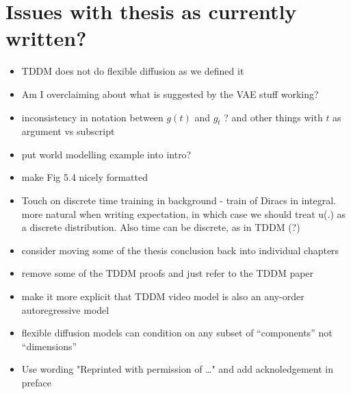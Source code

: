 \section*{Issues with thesis as currently written?}

\begin{itemize}
    \item TDDM does not do flexible diffusion as we defined it
    \item Am I overclaiming about what is suggested by the VAE stuff working?
    \item inconsistency in notation between $g(t)$ and $g_t$ ? and other things with $t$ as argument vs subscript
    \item put world modelling example into intro?
    \item make Fig 5.4 nicely formatted
    \item Touch on discrete time training in background - train of Diracs in integral. more natural when writing expectation, in which case we should treat u(.) as a discrete distribution. Also time can be discrete, as in TDDM (?)
    \item consider moving some of the thesis conclusion back into individual chapters
    \item remove some of the TDDM proofs and just refer to the TDDM paper
    \item make it more explicit that TDDM video model is also an any-order autoregressive model
    \item flexible diffusion models can condition on any subset of ``components'' not ``dimensions''
    \item Use wording "Reprinted with permission of …" and add acknoledgement in preface
\end{itemize}

